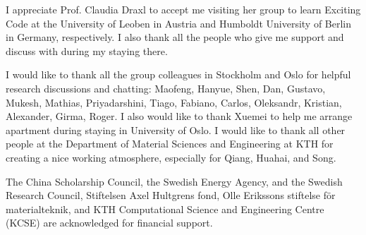 \documentclass[a4paper, 12pt, titlepage,oneside,drop]{kthesis}
\begin{document}
I appreciate Prof. Claudia Draxl to accept me visiting her group to learn Exciting Code at the University of Leoben in Austria and Humboldt University of Berlin in Germany, respectively. I also thank all the people who give me support and
discuss with during my staying there.

I would like to thank all the group colleagues in Stockholm and Oslo for helpful research discussions and chatting: Maofeng, Hanyue, Shen, Dan, Gustavo, Mukesh, Mathias, Priyadarshini, Tiago, Fabiano, Carlos, Oleksandr, Kristian,  Alexander, Girma, Roger. 
I also would like to thank Xuemei to help me arrange apartment during staying in University of Oslo. I would like to thank all other people at the Department of Material Sciences and Engineering at KTH for creating a nice working atmosphere,
especially for Qiang, Huahai, and Song.

The China Scholarship Council, the Swedish Energy Agency, and the Swedish Research Council, Stiftelsen Axel Hultgrens fond,  Olle Erikssons stiftelse för materialteknik, and KTH Computational Science and Engineering Centre (KCSE) 
are acknowledged for financial support.





\end{document}
